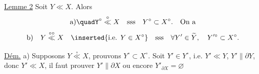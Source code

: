 \uline{Lemme 2}   Soit $Y\ll X$. Alors
\[
\text{a)}\quadY^\circ\overset{\circ}{\ll}X\quad\text{sss}\quad Y^\circ\subset X^\circ.\quad\text{On a}
\]
\[
\text{b)}\quad Y\overset{\circ\circ}{\ll}X\quad\inserted{\text{i.e. }Y\in X^\circ}\quad\text{sss}\quad\forall Y'\in\widetilde Y,\quad Y'^\circ\subset X^\circ.
\]

\uline{Dém.} a) Supposons $Y\overset{\circ}{\ll}X$, prouvons $Y^\circ\subset X^\circ$. Soit $Y'\in Y^\circ$, i.e. $Y'\ll Y$, $Y'\parallel\partial Y$, donc $Y'\ll X$, il faut prouver $Y'\parallel\partial X$ ou encore $Y'_{\partial X}=\varnothing$
